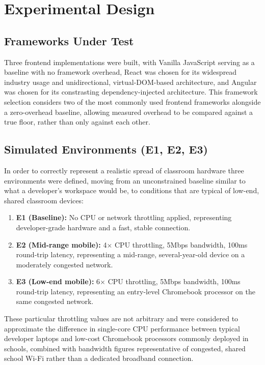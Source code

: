 \documentclass[11pt,a4paper]{report}
\begin{document}
\section{Experimental Design}

\subsection{Frameworks Under Test}

Three frontend implementations were built, with Vanilla JavaScript serving as a baseline with no framework overhead, React was chosen for its widespread industry usage and unidirectional, virtual-DOM-based architecture, and Angular was chosen for its constrasting dependency-injected architecture. This framework selection considers two of the most commonly used frontend frameworks alongside a zero-overhead baseline, allowing measured overhead to be compared against a true floor, rather than only against each other. 

\subsection{Simulated Environments (E1, E2, E3)}

In order to correctly represent a realistic spread of classroom hardware three environments were defined, moving from an unconstrained baseline similar to what a developer's workspace would be, to conditions that are typical of low-end, shared classroom devices:

\begin{enumerate}
  \item \textbf{E1 (Baseline):} No CPU or network throttling applied, representing developer-grade hardware and a fast, stable connection.
  \item \textbf{E2 (Mid-range mobile):} 4$\times$ CPU throttling, 5Mbps bandwidth, 100ms round-trip latency, representing a mid-range, several-year-old device on a moderately congested network.
  \item \textbf{E3 (Low-end mobile):} 6$\times$ CPU throttling, 5Mbps bandwidth, 100ms round-trip latency, representing an entry-level Chromebook processor on the same congested network.
\end{enumerate}   

These particular throttling values are not arbitrary and were considered to approximate the difference in single-core CPU performance between typical developer laptops and low-cost Chromebook processors commonly deployed in schools, combined with bandwidth figures representative of congested,
shared school Wi-Fi rather than a dedicated broadband connection.
\end{document}
